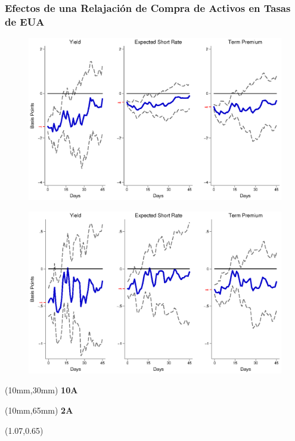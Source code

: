 \documentclass[12pt, aspectratio=169, xcolor=dvipsnames]{beamer}
\begin{document}
\begin{frame}[label=LSAPUS]
\frametitle{Efectos de una Relajación de Compra de Activos en Tasas de EUA}
\begin{figure}[!htbp]
\begin{center} %
\includegraphics[trim={0cm 0cm 0cm 0cm},clip,height=0.45\textheight,width=0.85\linewidth]{../Figures/LPs/LagDep-FX/LSAP/US/LSAPUSDnomyptp120m.eps}
\par\end{center}
\end{figure}
\vspace{-0.5cm}
\begin{figure}[!htbp]
\begin{center} %
\includegraphics[trim={0cm 0cm 0cm 0.76cm},clip,height=0.45\textheight,width=0.85\linewidth]{../Figures/LPs/LagDep-FX/LSAP/US/LSAPUSDnomyptp24m.eps}
\par\end{center}
\end{figure}
\begin{textblock*}{8mm}(10mm,30mm)
\small \textbf{10A}
\end{textblock*}
\begin{textblock*}{8mm}(10mm,65mm)
\small \textbf{2A}
\end{textblock*}
\begin{textblock*}{5cm}(1.07\textwidth,0.65\textheight)
\hyperlink{LSAPEM}{}
\end{textblock*}
\end{frame}
\end{document}
